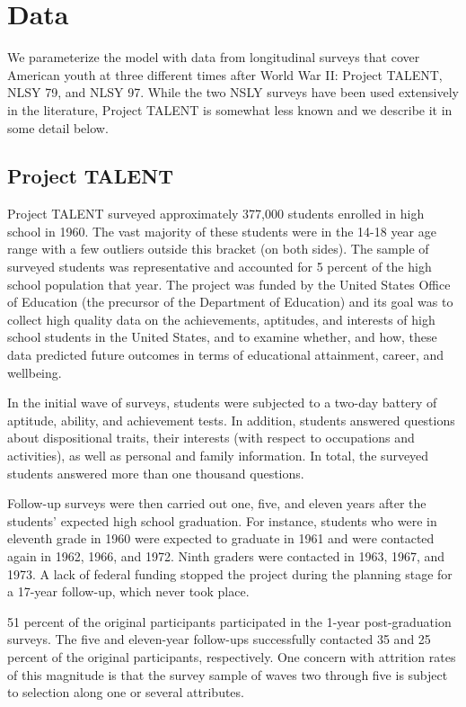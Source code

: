 \documentclass[onehalfspacing,11pt]{article}
\begin{document}
	\section{Data}\label{sec:data}
	
	We parameterize the model with data from longitudinal surveys that cover American youth at three different times after World War II: Project TALENT, NLSY 79, and NLSY 97. While the two NSLY surveys have been used extensively in the literature, Project TALENT is somewhat less known and we describe it in some detail below.
	\subsection{Project TALENT}
	
	Project TALENT surveyed approximately 377,000 students enrolled in high school in 1960. The vast majority of these students were in the 14-18 year age range with a few outliers outside this bracket (on both sides). The sample of surveyed students was representative and accounted for 5 percent of the high school population that year. The project was funded by the United States Office of Education (the precursor of the Department of Education) and its goal was to collect high quality data on the achievements, aptitudes, and interests of high school students in the United States, and to examine whether, and how, these data predicted future outcomes in terms of educational attainment, career, and wellbeing.
	
	In the initial wave of surveys, students were subjected to a two-day battery of aptitude, ability, and achievement tests. In addition, students answered questions about dispositional traits, their interests (with respect to occupations and activities), as well as personal and family information. 	In total, the surveyed students answered more than one thousand questions.
	
	Follow-up surveys were then carried out one, five, and eleven years after the students' expected high school graduation. For instance, students who were in eleventh grade in 1960 were expected to graduate in 1961 and were contacted again in 1962, 1966, and 1972. Ninth graders were contacted in 1963, 1967, and 1973. A lack of federal funding stopped the project during the planning stage for a 17-year follow-up, which never took place.
	
	51 percent of the original participants participated in the 1-year post-graduation surveys. The five and eleven-year follow-ups successfully contacted 35 and 25 percent of the original participants, respectively. One concern with attrition rates of this magnitude is that the survey sample of waves two through five is subject to selection along one or several attributes.
	
\end{document}
